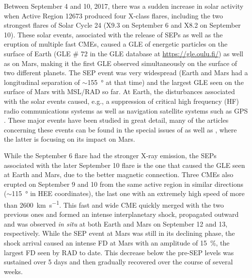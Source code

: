 Between September 4 and 10, 2017, there was a sudden increase in solar activity when Active Region 12673 produced four X-class flares, including the two strongest flares of Solar Cycle 24 (X9.3 on September 6 and X8.2 on September 10).
These solar events, associated with the release of \acp{SEP} as well as the eruption of multiple fast \acp{CME}, caused a \ac{GLE} of energetic particles on the surface of Earth (\ac{GLE} \# 72 in the \ac{GLE} database at \url{https://gle.oulu.fi/}) as well as on Mars, making it the first \ac{GLE} observed simultaneously on the surface of two different planets.
The \ac{SEP} event was very widespread (Earth and Mars had a longitudinal separation of $\sim$\SI{155}{\degree} at that time) and the largest \ac{GLE} seen on the surface of Mars with \ac{MSL}/\ac{RAD} so far. At Earth, the disturbances associated with the solar events caused, e.g., a suppression of critical high frequency (HF) radio communications systems \citep{Frissell-2018,Bland-2018} as well as navigation satellite systems such as GPS \citep{Berdermann-2018,Sato-2019}.
These major events have been studied in great detail, many of the articles concerning these events can be found in the special issues of \citet{SpaceWeather-2018-special-issue-September-event} as well as \citet{GRL-2018-special-issue-September-event}, where the latter is focusing on its impact on Mars.

While the September 6 flare had the stronger X-ray emission, the \acp{SEP} associated with the later September 10 flare is the one that caused the \ac{GLE} seen at Earth and Mars, due to the better magnetic connection. Three CMEs also erupted on September 9 and 10 from the same active region in similar directions ($\sim$\SI{115}{\degree} in \ac{HEE} coordinates), the last one with an extremely high speed of more than \SI{2600}{\kilo\meter\per\second}. This fast and wide CME quickly merged with the two previous ones and formed an intense interplanetary shock, propagated outward and was observed \textit{in situ} at both Earth and Mars on September 12 and 13, respectively. While the \ac{SEP} event at Mars was still in its declining phase, the shock arrival caused an intense \ac{FD} at Mars with an amplitude of \SI{15}{\percent}, the largest \ac{FD} seen by \ac{RAD} to date. This decrease below the pre-\ac{SEP} levels was sustained over 5 days and then gradually recovered over the course of several weeks.

